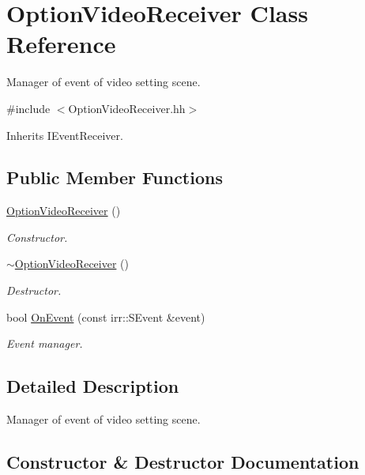 \hypertarget{classOptionVideoReceiver}{}\section{Option\+Video\+Receiver Class Reference}
\label{classOptionVideoReceiver}


Manager of event of video setting scene.  




{\ttfamily \#include $<$Option\+Video\+Receiver.\+hh$>$}



Inherits I\+Event\+Receiver.

\subsection*{Public Member Functions}
\begin{DoxyCompactItemize}
\item 
\hyperlink{classOptionVideoReceiver_ac513ff2e3b42ab38dc47b07ece611a61}{Option\+Video\+Receiver} ()
\begin{DoxyCompactList}\small\item\em Constructor. \end{DoxyCompactList}\item 
\hyperlink{classOptionVideoReceiver_ab014b77305c68f220fa5a0c8e9e57cb9}{$\sim$\+Option\+Video\+Receiver} ()
\begin{DoxyCompactList}\small\item\em Destructor. \end{DoxyCompactList}\item 
bool \hyperlink{classOptionVideoReceiver_a203025900c489eb2df12a6b3471c3caa}{On\+Event} (const irr\+::\+S\+Event \&event)
\begin{DoxyCompactList}\small\item\em Event manager. \end{DoxyCompactList}\end{DoxyCompactItemize}


\subsection{Detailed Description}
Manager of event of video setting scene. 

\subsection{Constructor \& Destructor Documentation}
\mbox{\label{classOptionVideoReceiver_ac513ff2e3b42ab38dc47b07ece611a61}} 
